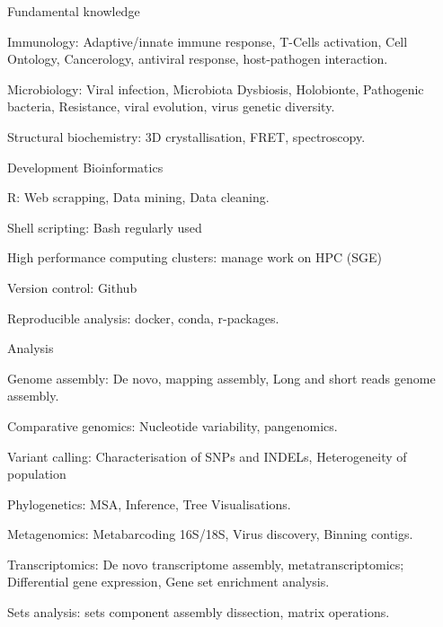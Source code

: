 \begin{cventries}
  \cventry
    {Fundamental knowledge} %
    {} %
    {} %
    {} %
    {
      \begin{cvitems} %
        \item {Immunology: Adaptive/innate immune response, T-Cells activation, Cell Ontology, Cancerology, antiviral response, host-pathogen interaction.}
        \item {Microbiology: Viral infection, Microbiota Dysbiosis, Holobionte, Pathogenic bacteria, Resistance, viral evolution, virus genetic diversity.}
        \item {Structural biochemistry: 3D crystallisation, FRET, spectroscopy.}
      \end{cvitems}
    }

  \cventry
    {Development} %
    {Bioinformatics} %
    {} %
    {} %
    {
      \begin{cvitems} %
        \item {R: Web scrapping, Data mining, Data cleaning.}
        \item {Shell scripting: Bash regularly used}
        \item {High performance computing clusters: manage work on HPC (SGE)}
        \item {Version control: Github}
        \item {Reproducible analysis: docker, conda, r-packages.}
      \end{cvitems}
    }

  \cventry
    {Analysis} %
    {} %
    {} %
    {} %
    {
      \begin{cvitems} %
        \item {Genome assembly: De novo, mapping assembly, Long and short reads genome assembly.}
        \item {Comparative genomics: Nucleotide variability, pangenomics.}
        \item {Variant calling: Characterisation of SNPs and INDELs, Heterogeneity of population}
        \item {Phylogenetics: MSA, Inference, Tree Visualisations.}
        \item {Metagenomics: Metabarcoding 16S/18S, Virus discovery, Binning contigs.}
        \item {Transcriptomics: De novo transcriptome assembly, metatranscriptomics; Differential gene expression, Gene set enrichment analysis.}
        \item {Sets analysis: sets component assembly dissection, matrix operations.}
      \end{cvitems}
    }


\end{cventries}